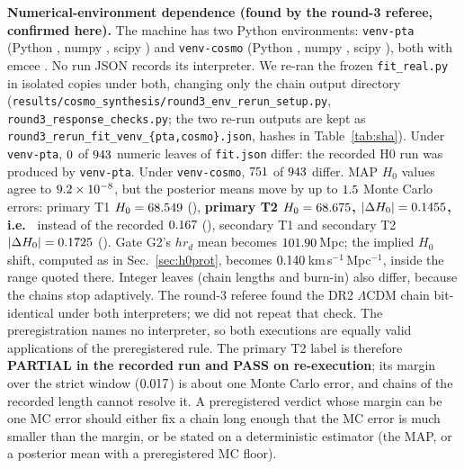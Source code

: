 \documentclass[11pt]{article}
\newcommand{\kms}{km\,s$^{-1}$\,Mpc$^{-1}$}
\begin{document}
\textbf{Numerical-environment dependence (found by the round-3 referee, confirmed here).}\label{sec:env}
The machine has two Python environments: \texttt{venv-pta} (Python \evPtaPy, numpy \evPtaNp, scipy \evPtaSp) and \texttt{venv-cosmo} (Python \evCosPy, numpy \evCosNp,
scipy \evCosSp), both with emcee \evEmcee. No run JSON records its interpreter. We re-ran the frozen \texttt{fit\_real.py} in isolated copies under both,
changing only the chain output directory (\texttt{results/cosmo\_synthesis/round3\_env\_rerun\_setup.py}, \texttt{round3\_response\_checks.py}; the two re-run outputs are kept as \texttt{round3\_rerun\_fit\_venv\_\{pta,cosmo\}.json}, hashes in Table~\ref{tab:sha}). Under
\texttt{venv-pta}, $0$ of $943$ numeric leaves of \texttt{fit.json} differ: the recorded H0 run was produced by \texttt{venv-pta}. Under
\texttt{venv-cosmo}, $751$ of $943$ differ. MAP $H_0$ values agree to $9.2\times10^{-8}$, but the posterior means move by up to $1.5$ Monte Carlo
errors: primary T1 $H_0=68.549$ (\rePOneV), \textbf{primary T2 $H_0=68.675$, $|\Delta H_0|=0.1455$, i.e.\ \rePTwoV} instead of the recorded $0.167$ (\hzPTwoV),
secondary T1 \reSOneV{} and secondary T2 $|\Delta H_0|=0.1725$ (\reSTwoV). Gate G2's $hr_d$ mean becomes $101.90$\,Mpc; the implied $H_0$ shift, computed as in Sec.~\ref{sec:h0prot}, becomes $0.140$\,\kms, inside the range quoted there.
Integer leaves (chain lengths and burn-in) also differ, because the chains stop adaptively. The round-3 referee found the DR2 $\Lambda$CDM chain bit-identical under both interpreters; we did not repeat that check. The preregistration
names no interpreter, so both executions are equally valid applications of the preregistered rule. The primary T2 label is therefore \textbf{PARTIAL in the
recorded run and PASS on re-execution}; its margin over the strict window ($0.017$) is about one Monte Carlo error, and chains of the recorded length cannot resolve
it. A preregistered verdict whose margin can be one MC error should either fix a chain long enough that the MC error is much smaller than the margin, or be stated
on a deterministic estimator (the MAP, or a posterior mean with a preregistered MC floor).
\end{document}
